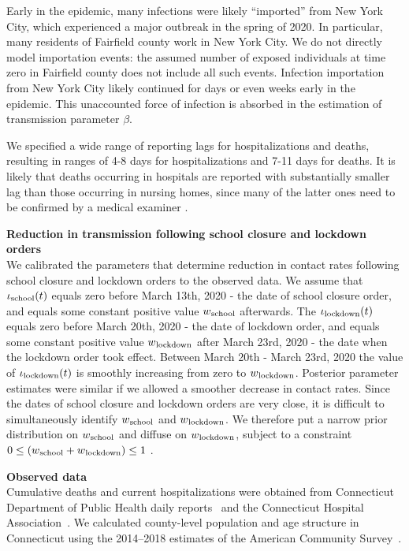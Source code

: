 \documentclass[11pt]{article}
\begin{document}
Early in the epidemic, many infections were likely ``imported'' from New York City, which experienced a major outbreak in the spring of 2020. In particular, many residents of Fairfield county work in New York City. We do not directly model importation events: the assumed number of exposed individuals at time zero in Fairfield county does not include all such events. Infection importation from New York City likely continued for days or even weeks early in the epidemic. This unaccounted force of infection is absorbed in the estimation of transmission parameter $\beta$.

We specified a wide range of reporting lags for hospitalizations and deaths, resulting in ranges of 4-8 days for hospitalizations and 7-11 days for deaths. It is likely that deaths occurring in hospitals are reported with substantially smaller lag than those occurring in nursing homes, since many of the latter ones need to be confirmed by a medical examiner \citep{DPHwebsitenursing}.  

\textbf{Reduction in transmission following school closure and lockdown orders} \\[0.5em]
We calibrated the parameters that determine reduction in contact rates following school closure and lockdown orders to the observed data. 
We assume that $\iota\textsubscript{school}(t)$ equals zero before March 13th, 2020 - the date of school closure order, and equals some constant positive value $w\textsubscript{school}$ afterwards. 
The  $\iota\textsubscript{lockdown} (t)$ equals zero before March 20th, 2020 - the date of lockdown order, and equals some constant positive value $w\textsubscript{lockdown}$ after March 23rd, 2020 - the date when the lockdown order took effect. Between March 20th - March 23rd, 2020 the value of $\iota\textsubscript{lockdown} (t)$ is smoothly increasing from zero to $w\textsubscript{lockdown}$. Posterior parameter estimates were similar if we allowed a smoother decrease in contact rates.
Since the dates of school closure and lockdown orders are very close, it is difficult to simultaneously identify $w\textsubscript{school}$ and $w\textsubscript{lockdown}$. We therefore put a narrow prior distribution on $w\textsubscript{school}$ and diffuse on $w\textsubscript{lockdown}$, subject to a constraint $ 0 \le (w\textsubscript{school} + w\textsubscript{lockdown}) \le 1$ . 


\textbf{Observed data} \\[0.5em]
Cumulative deaths and current hospitalizations were obtained from Connecticut Department of Public Health daily reports~\citep{DPHwebsite} and the Connecticut Hospital Association~\citep{CHAwebsite}. 
We calculated county-level population and age structure in Connecticut using the 2014--2018 estimates of the American Community Survey~\citep{acs2018}. 
\end{document}
